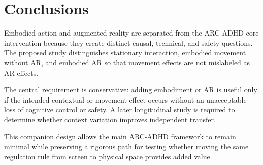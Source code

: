 \section{Conclusions}

Embodied action and augmented reality are separated from the ARC-ADHD core intervention because they create distinct causal, technical, and safety questions. The proposed study distinguishes stationary interaction, embodied movement without AR, and embodied AR so that movement effects are not mislabeled as AR effects.

The central requirement is conservative: adding embodiment or AR is useful only if the intended contextual or movement effect occurs without an unacceptable loss of cognitive control or safety. A later longitudinal study is required to determine whether context variation improves independent transfer.

This companion design allows the main ARC-ADHD framework to remain minimal while preserving a rigorous path for testing whether moving the same regulation rule from screen to physical space provides added value.
